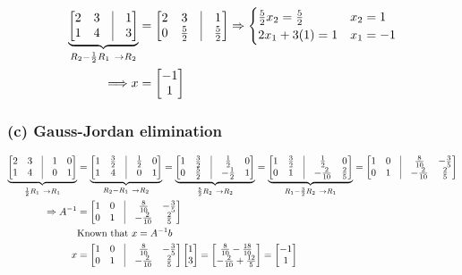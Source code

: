 \documentclass[11pt]{article}
\providecommand{\qbm}[1]{\begin{bmatrix} #1 \end{bmatrix}}
\begin{document}
\begin{align*}
    \underbrace{\qbm{ 2 & 3 & \vline & 1 \\ 1 & 4 & \vline & 3}}_{R_2 - \frac{1}{2} R_1 \ \to R_2} &= \qbm{ 2 & 3 & \vline & 1 \\ 0 & \frac{5}{2} & \vline & \frac{5}{2}}
    \Rightarrow \begin{cases}
        \frac{5}{2} x_2 = \frac{5}{2} & x_2 = 1 \\
        2 x_1 + 3(1) = 1 & x_1 = -1
    \end{cases} \\
    \Longrightarrow x &= \qbm{-1 \\ 1}
\end{align*}



\subsubsection*{(c) Gauss-Jordan elimination}


\begin{align*}
    \underbrace{\qbm{ 2 & 3 & \vline & 1 & 0 \\ 1 & 4 & \vline & 0 & 1}}_{\frac{1}{2} R_1 \ \to R_1} &= \underbrace{\qbm{ 1 & \frac{3}{2} & \vline & \frac{1}{2} & 0 \\ 1 & 4 & \vline & 0 & 1}}_{R_2 - R_1 \ \to R_2} = \underbrace{\qbm{ 1 & \frac{3}{2} & \vline & \frac{1}{2} & 0 \\ 0 & \frac{5}{2} & \vline & -\frac{1}{2} & 1}}_{\frac{5}{2}R_2 \ \to R_2} = \underbrace{\qbm{ 1 & \frac{3}{2} & \vline & \frac{1}{2} & 0 \\ 0 & 1 & \vline & -\frac{2}{10} & \frac{2}{5}}}_{R_1 - \frac{3}{2} R_2 \ \to R_1} = \qbm{ 1 & 0 & \vline & \frac{8}{10} & -\frac{3}{5} \\ 0 & 1 & \vline & -\frac{2}{10} & \frac{2}{5}} \\
    \Rightarrow A^{-1} &= \qbm{ 1 & 0 & \vline & \frac{8}{10} & -\frac{3}{5} \\ 0 & 1 & \vline & -\frac{2}{10} & \frac{2}{5}} \\
    &\text{Known that} \ x = A^{-1} b \\
    x &= \qbm{ 1 & 0 & \vline & \frac{8}{10} & -\frac{3}{5} \\ 0 & 1 & \vline & -\frac{2}{10} & \frac{2}{5}} \qbm{1 \\ 3} = \qbm{\frac{8}{10} - \frac{18}{10} \\ -\frac{2}{10} + \frac{12}{5}} = \qbm{-1 \\ 1}
\end{align*}\newline
\end{document}
